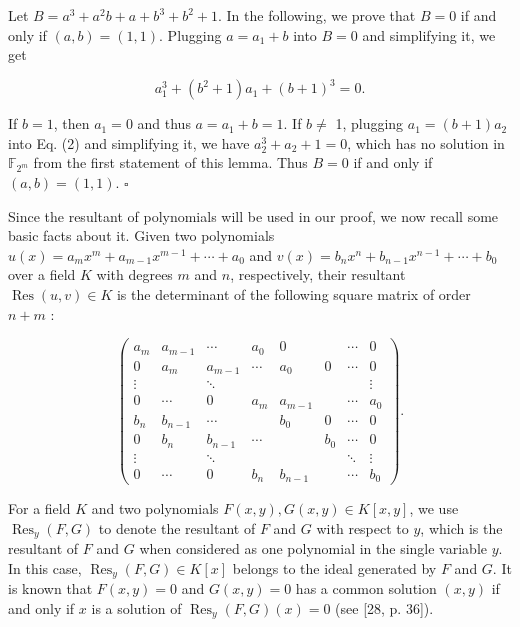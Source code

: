 \documentclass[10pt]{article}
\begin{document}
Let $B=a^{3}+a^{2} b+a+b^{3}+b^{2}+1$. In the following, we prove that $B=0$ if and only if $(a, b)=(1,1)$. Plugging $a=a_{1}+b$ into $B=0$ and simplifying it, we get


\begin{equation*}
a_{1}^{3}+\left(b^{2}+1\right) a_{1}+(b+1)^{3}=0 . \tag{2}
\end{equation*}


If $b=1$, then $a_{1}=0$ and thus $a=a_{1}+b=1$. If $b \neq$ 1, plugging $a_{1}=(b+1) a_{2}$ into Eq. (2) and simplifying it, we have $a_{2}^{3}+a_{2}+1=0$, which has no solution in $\mathbb{F}_{2^{m}}$ from the first statement of this lemma. Thus $B=0$ if and only if $(a, b)=(1,1)$. \(\square\)

Since the resultant of polynomials will be used in our proof, we now recall some basic facts about it. Given two polynomials $u(x)=a_{m} x^{m}+a_{m-1} x^{m-1}+\cdots+a_{0}$ and $v(x)=b_{n} x^{n}+b_{n-1} x^{n-1}+\cdots+b_{0}$ over a field $K$ with degrees $m$ and $n$, respectively, their resultant $\operatorname{Res}(u, v) \in K$ is the determinant of the following square matrix of order $n+m$ :

$$
\left(\begin{array}{cccccccc}
a_{m} & a_{m-1} & \cdots & a_{0} & 0 & & \cdots & 0 \\
0 & a_{m} & a_{m-1} & \cdots & a_{0} & 0 & \cdots & 0 \\
\vdots & & \ddots & & & & & \vdots \\
0 & \cdots & 0 & a_{m} & a_{m-1} & & \cdots & a_{0} \\
b_{n} & b_{n-1} & \cdots & & b_{0} & 0 & \cdots & 0 \\
0 & b_{n} & b_{n-1} & \cdots & & b_{0} & \cdots & 0 \\
\vdots & & \ddots & & & & \ddots & \vdots \\
0 & \cdots & 0 & b_{n} & b_{n-1} & & \cdots & b_{0}
\end{array}\right) .
$$

For a field $K$ and two polynomials $F(x, y), G(x, y) \in K[x, y]$, we use $\operatorname{Res}_{y}(F, G)$ to denote the resultant of $F$ and $G$ with respect to $y$, which is the resultant of $F$ and $G$ when considered as one polynomial in the single variable $y$. In this case, $\operatorname{Res}_{y}(F, G) \in K[x]$ belongs to the ideal generated by $F$ and $G$. It is known that $F(x, y)=0$ and $G(x, y)=0$ has a common solution $(x, y)$ if and only if $x$ is a solution of $\operatorname{Res}_{y}(F, G)(x)=0$ (see [28, p. 36]).
\end{document}
